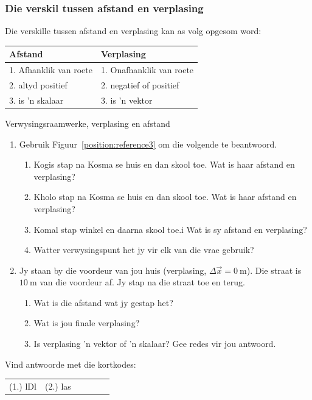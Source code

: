 \subsubsection*{Die verskil tussen afstand en verplasing}
            \nopagebreak
Die verskille tussen afstand en verplasing kan as volg opgesom word:\par
\begin{center}
\begin{tabular}{|l|l|}\hline
\textbf{ Afstand} & \textbf{ Verplasing} \\\hline
1. Afhanklik van roete & 1. Onafhanklik van roete \\\hline
2. altyd positief & 2. negatief of positief \\\hline
3. is 'n skalaar & 3. is 'n vektor\\\hline
\end{tabular}
\end{center}
    \par
\label{m38788*secfhsst!!!underscore!!!id498}
\begin{exercises}{Verwysingsraamwerke, verplasing en afstand}
\nopagebreak \noindent
\begin{enumerate}[noitemsep, label=\textbf{\arabic*}. ] 
\item Gebruik Figuur~\ref{position:reference3} om die volgende te beantwoord.
\begin{enumerate}[noitemsep, label=\textbf{\alph*}. ] 
    \item Kogis stap na Kosma se huis en dan skool toe. Wat is haar afstand en verplasing?
    \item Kholo stap na Kosma se huis en dan skool toe. Wat is haar afstand en verplasing?
    \item Komal stap winkel en daarna skool toe.i Wat is sy afstand en verplasing?
    \item Watter verwysingspunt het jy vir elk van die vrae gebruik?
\end{enumerate}
                
\item Jy staan by die voordeur van jou huis (verplasing, $\Delta \vec{x}=0~\text{m}$). Die straat is $10~\text{m}$ van die voordeur af. Jy stap na die straat toe en terug.
\begin{enumerate}[noitemsep, label=\textbf{\alph*}. ] 
    \item Wat is die afstand wat jy gestap het?
    \item Wat is jou finale verplasing?
    \item Is verplasing 'n vektor of 'n skalaar? Gee redes vir jou antwoord.
\end{enumerate}
\end{enumerate}
  \label{m38788**end}
\par {} Vind antwoorde met die kortkodes:
 \par \begin{tabular}[h]{cccccc}
 (1.) lDl  &  (2.) las  & \end{tabular}
\end{exercises}
